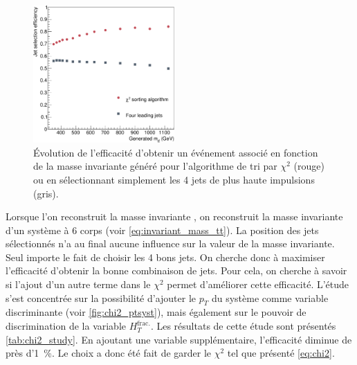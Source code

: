 \begin{figure}[tbp]
  \centering
  \includegraphics[width=0.48\textwidth]{chapitre6/figs/chi2/jet_selection_efficiency.pdf}
  \caption{ Évolution de l'efficacité d'obtenir un événement associé en fonction de la masse invariante \ttbar généré pour l'algorithme de tri par $\chi^2$ (\textcolor{rouge_grandmere}{rouge}) ou en sélectionnant simplement les 4 jets de plus haute impulsions (\textcolor{bleu_gris}{gris}).}
  \label{fig:chi2_vs_jets}
\end{figure}

Lorsque l'on reconstruit la masse invariante \ttbar, on reconstruit la masse invariante d'un système à 6 corps (voir \cref{eq:invariant_mass_tt}). La position des jets sélectionnés n'a au final aucune influence sur la valeur de la masse invariante. Seul importe le fait de choisir les 4 bons jets. On cherche donc à maximiser l'efficacité d'obtenir la bonne combinaison de jets. Pour cela, on cherche à savoir si l'ajout d'un autre terme dans le $\chi^2$ permet d'améliorer cette efficacité. L'étude s'est concentrée sur la possibilité d'ajouter le $p_T$ du système \ttbar comme variable discriminante (voir  \cref{fig:chi2_ptsyst}), mais également sur le pouvoir de discrimination de la variable $H_{T}^{\text{frac.}}$. Les résultats de cette étude sont présentés \cref{tab:chi2_study}. En ajoutant une variable supplémentaire, l'efficacité diminue de près d'\SI{1}{\%}. Le choix a donc été fait de garder le $\chi^2$ tel que présenté \cref{eq:chi2}.

